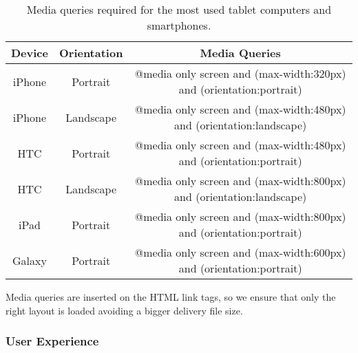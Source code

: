 \begin{table}[!h]
	\begin{tabular}{| c | c | c |}
	\hline
	\textbf{Device} & \textbf{Orientation} & \textbf{Media Queries} \\ \hline
	iPhone & Portrait & @media only screen and (max-width:320px) and (orientation:portrait)\\ \hline
	iPhone & Landscape & @media only screen and (max-width:480px) and (orientation:landscape)\\ \hline
	HTC & Portrait & @media only screen and (max-width:480px) and (orientation:portrait)\\ \hline
	HTC & Landscape & @media only screen and (max-width:800px) and (orientation:landscape)\\ \hline
	iPad & Portrait & @media only screen and (max-width:800px) and (orientation:portrait)\\ \hline
	Galaxy & Portrait & @media only screen and (max-width:600px) and (orientation:portrait)\\
	\hline
	\end{tabular}
	\caption{Media queries required for the most used tablet computers and smartphones.}
\end{table}

Media queries are inserted on the HTML link tags, so we ensure that only the right layout is loaded avoiding a bigger delivery file size.

\subsubsection{User Experience}	    %